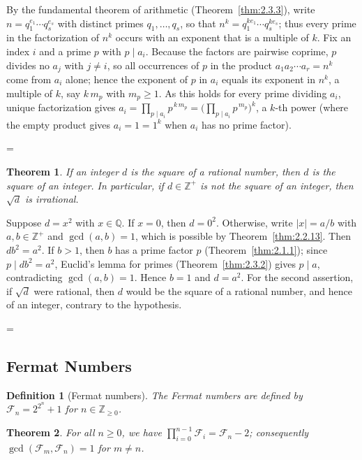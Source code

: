 \documentclass[11pt]{article}
\makeatletter
\theoremstyle{ntstyle}
\newtheorem{theorem}{Theorem}[subsection]
\newtheorem{definition}{Definition}[subsection]
\let\nt@closedisplay\]
\def\nt@guardedclose{\@ifnextchar\par{\nt@closeafterpar}{\@ifnextchar\end{\postdisplaypenalty\@M\nt@closedisplay}{\nt@closedisplay}}}
\def\nt@closeafterpar\par{\@ifnextchar\par{\nt@closeafterpar}{\@ifnextchar\end{\postdisplaypenalty\@M\nt@closedisplay\par}{\nt@closedisplay\par}}}
\renewenvironment{proof}[1][\proofname]{\par
  \pushQED{\qed}\normalfont\topsep\medskipamount\edef\nt@afterproof{\@endparpenalty=\the\@endparpenalty\relax}\@beginparpenalty\@M\@endparpenalty\@M\let\]\nt@guardedclose\trivlist\item[]\textit{#1\@addpunct{.}} \ignorespaces}{\ifvmode\addpenalty\@M\fi\popQED\nt@afterproof\endtrivlist\@endpefalse}
\makeatother
\begin{document}
\begin{proof} By the fundamental theorem of arithmetic
	(Theorem~\ref{thm:2.3.3}), write $n=q_1^{e_1}\cdots q_s^{e_s}$ with distinct
	primes $q_1,\ldots,q_s$, so that $n^{k}=q_1^{ke_1}\cdots q_s^{ke_s}$;
	thus every prime in the factorization of $n^{k}$ occurs with an
	exponent that is a multiple of $k$. Fix an index $i$ and a prime $p$
	with $p\mid a_i$. Because the factors are pairwise coprime, $p$
	divides no $a_j$ with $j\neq i$, so all occurrences of $p$ in the
	product $a_1a_2\cdots a_r=n^{k}$ come from $a_i$ alone; hence the
	exponent of $p$ in $a_i$ equals its exponent in $n^{k}$, a multiple
	of $k$, say $k\,m_p$ with $m_p\ge1$. As this holds for every prime
	dividing $a_i$, unique factorization gives $a_i=\prod_{p\mid
			a_i}p^{\,k\,m_p}=\Big(\prod_{p\mid a_i}p^{\,m_p}\Big)^{k}$, a $k$-th
	power (where the empty product gives $a_i=1=1^{k}$ when $a_i$ has no prime
	factor).

\end{proof}
\begin{theorem}\label{thm:2.3.7} If an integer $d$ is the square of a rational
	number, then $d$ is the square of an integer. In particular, if
	$d\in\mathbb{Z}^+$ is not the square of an integer, then $\sqrt{d}$ is
	irrational.

\end{theorem}

\begin{proof} Suppose $d=x^2$ with $x\in\mathbb{Q}$. If $x=0$, then
	$d=0^2$. Otherwise, write $|x|=a/b$ with $a,b\in\mathbb{Z}^+$ and
	$\gcd(a,b)=1$, which is possible by Theorem~\ref{thm:2.2.13}. Then
	$db^2=a^2$. If $b>1$, then $b$ has a prime factor $p$
	(Theorem~\ref{thm:2.1.1}); since $p\mid db^2=a^2$, Euclid's lemma for primes
	(Theorem~\ref{thm:2.3.2}) gives $p\mid a$, contradicting $\gcd(a,b)=1$.
	Hence $b=1$ and $d=a^2$. For the second assertion, if $\sqrt{d}$ were
	rational, then $d$ would be the square of a rational number, and hence of
	an integer, contrary to the hypothesis.

\end{proof}
\subsection{Fermat Numbers}
\begin{definition}[Fermat numbers]\label{def:2.4.1} The Fermat numbers are defined by $\mathcal{F}_n =
			2^{2^{n}} + 1$ for $n\in\mathbb{Z}_{\ge0}$.

\end{definition}
\begin{theorem}\label{thm:2.4.1}
	For all $n\ge0$, we have $\prod_{i=0}^{n-1}\mathcal{F}_i=\mathcal{F}_n-2$;
	consequently $\gcd(\mathcal{F}_m, \mathcal{F}_n)=1$ for $m\neq n$.

\end{theorem}
\end{document}
